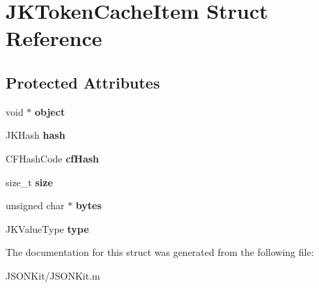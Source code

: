 \hypertarget{struct_j_k_token_cache_item}{\section{J\+K\+Token\+Cache\+Item Struct Reference}
\label{struct_j_k_token_cache_item}
}
\subsection*{Protected Attributes}
\begin{DoxyCompactItemize}
\item 
\hypertarget{struct_j_k_token_cache_item_a2e20066b2f883735899c4a2b5d0f485c}{void $\ast$ {\bfseries object}}\label{struct_j_k_token_cache_item_a2e20066b2f883735899c4a2b5d0f485c}

\item 
\hypertarget{struct_j_k_token_cache_item_a435cc4ad29e22676dc63f86d57505792}{J\+K\+Hash {\bfseries hash}}\label{struct_j_k_token_cache_item_a435cc4ad29e22676dc63f86d57505792}

\item 
\hypertarget{struct_j_k_token_cache_item_acdee4c0f0ca5d2beb2726d32188cf3cf}{C\+F\+Hash\+Code {\bfseries cf\+Hash}}\label{struct_j_k_token_cache_item_acdee4c0f0ca5d2beb2726d32188cf3cf}

\item 
\hypertarget{struct_j_k_token_cache_item_af207b8177d67ed341eb7d76a8818f599}{size\+\_\+t {\bfseries size}}\label{struct_j_k_token_cache_item_af207b8177d67ed341eb7d76a8818f599}

\item 
\hypertarget{struct_j_k_token_cache_item_a8da7d44fc8a4146563cf907cb4952aea}{unsigned char $\ast$ {\bfseries bytes}}\label{struct_j_k_token_cache_item_a8da7d44fc8a4146563cf907cb4952aea}

\item 
\hypertarget{struct_j_k_token_cache_item_a3966e59525ab02ab68125e7de34b904b}{J\+K\+Value\+Type {\bfseries type}}\label{struct_j_k_token_cache_item_a3966e59525ab02ab68125e7de34b904b}

\end{DoxyCompactItemize}


The documentation for this struct was generated from the following file\+:\begin{DoxyCompactItemize}
\item 
J\+S\+O\+N\+Kit/J\+S\+O\+N\+Kit.\+m\end{DoxyCompactItemize}

